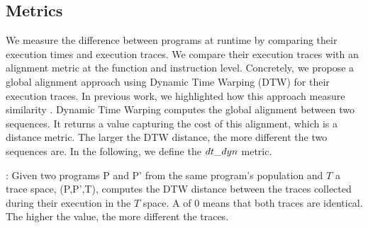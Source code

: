\subsection{Metrics}

We measure the difference between programs at runtime by comparing their execution times and execution traces. We compare their execution traces with an alignment metric at the function and instruction level. Concretely, we propose a global alignment approach using Dynamic Time Warping (DTW) for their execution traces. In previous work, we highlighted how this approach measure similarity \citationneeded. 
Dynamic Time Warping \cite{Maia08usinga} computes the global alignment between two sequences. It returns a value capturing the cost of this alignment, which is a distance metric. The larger the DTW distance, the more different the two sequences are.
In the following, we define the $dt\_dyn$ metric. 
 

\begin{metric}{\DTW{}:}
\label{metric:stack}
	Given two programs P and P' from the same program's population and $T$ a trace space, \DTW{}(P,P',T), computes the DTW distance between the traces collected during their execution in the $T$ space. A \DTW{} of $0$ means that both traces are identical. \\ 
	
	The higher the value, the more different the traces. 
\end{metric}


